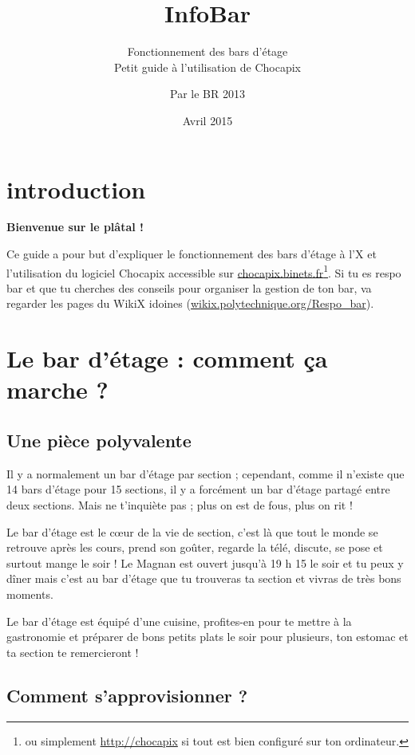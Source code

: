 \documentclass[12pt,french]{article}
\title{InfoBar}
\subtitle{Fonctionnement des bars d'étage\\Petit guide à l'utilisation de Chocapix}
\author{Par le BR 2013}
\date{Avril 2015}
\begin{document}
\maketitle

\section*{introduction}

\begin{center}
\bfseries Bienvenue sur le plâtal ! 
\end{center}

Ce guide a pour but d'expliquer le fonctionnement des bars d'étage à l'X et l'utilisation du logiciel Chocapix accessible sur \url{chocapix.binets.fr}\footnote{ou simplement \url{http://chocapix} si tout est bien configuré sur ton ordinateur.}. Si tu es respo bar et que tu cherches des conseils pour organiser la gestion de ton bar, va regarder les pages du WikiX idoines (\url{wikix.polytechnique.org/Respo_bar}).


\tableofcontents

\clearpage

\section{Le bar d'étage : comment ça marche ?}

\subsection{Une pièce polyvalente}

Il y a normalement un bar d'étage par section ; cependant, comme il n'existe que 14 bars d'étage pour 15 sections, il y a forcément un bar d'étage partagé entre deux sections. Mais ne t'inquiète pas ; plus on est de fous, plus on rit !

Le bar d'étage est le cœur de la vie de section, c'est là que tout le monde se retrouve après les cours, prend son goûter, regarde la télé, discute, se pose et surtout mange le soir ! Le Magnan est ouvert jusqu'à 19 h 15 le soir et tu peux y dîner mais c'est au bar d'étage que tu trouveras ta section et vivras de très bons moments.

Le bar d'étage est équipé d'une cuisine, profites-en pour te mettre à la gastronomie et préparer de bons petits plats le soir pour plusieurs, ton estomac et ta section te remercieront ! 

\subsection{Comment s'approvisionner ?}
\end{document}
